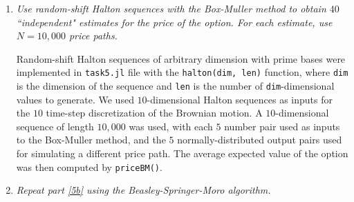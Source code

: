 \documentclass{article}
\DeclarePairedDelimiter \parens{(}{)}
\begin{document}
\begin{enumerate}
\begin{enumerate}
                If we model the stock price as a Geometric Brownian Motion, we obtain the following general formula for the stock price assuming no arbitrage
                $S_t = S_0e^{\displaystyle\parens*{r - \sfrac{\sigma^2}{2}}t - \sigma W(t)}$
                where $W(t) \sim N\parens*{0, \sqrt{t}}$ is a standard Brownian motion.
                To find the price $C$ of a European call option written on $S$ with strike $K = 50$ with maturity $T = 1$,
                we use the Black-Scholes formula, here adapted from Baxter \& Rennie's Financial Calculus,
                \begin{align*}
                    C &= S_0\Phi\parens*{\frac{\log\parens*{\sfrac{S_0}{K}} + \parens*{r + \sfrac{\sigma^2}{2}}T}{\sigma\sqrt{T}}}
                    - Ke^{-rT}\Phi\parens*{\frac{\log\parens*{\sfrac{S_0}{K}} + \parens*{r - \sfrac{\sigma^2}{2}}T}{\sigma\sqrt{T}}}\\
                    &= 50\Phi\parens*{\frac{\log\parens*{1} + \parens*{0.1 + \sfrac{0.09}{2}}}{0.3}}
                    - 50e^{-0.1}\Phi\parens*{\frac{\log\parens*{1} + \parens*{0.1 - \sfrac{0.09}{2}}}{0.3}}\\
                    &= 50\parens*{\Phi\parens*{\frac{0.145}{0.3}} - e^{-0.1}\Phi\parens*{\frac{0.055}{0.3}}}\\
                    &\approx 50\parens*{0.6855704621388224 - e^{-0.1}0.5727317593030405}\\
                    &\approx 8.367066791193329,
                \end{align*}
                and approximated using Julia, where $\Phi$ is the standard normal cumulative distribution function.
            \item \label{5b}
                {\it Use random-shift Halton sequences with the Box-Muller method to obtain $40$ ``independent" estimates for the price of the option.
                For each estimate, use $N = 10,000$ price paths.}

                Random-shift Halton sequences of arbitrary dimension with prime bases were implemented in \texttt{task5.jl} file with the
                \texttt{halton(dim, len)} function, where \texttt{dim} is the dimension of the sequence and \texttt{len} is the number of
                \texttt{dim}-dimensional values to generate.
                We used $10$-dimensional Halton sequences as inputs for the $10$ time-step discretization of the Brownian motion.
                A $10$-dimensional sequence of length $10,000$ was used, with each $5$ number pair used as inputs to the Box-Muller method,
                and the $5$ normally-distributed output pairs used for simulating a different price path.
                The average expected value of the option was then computed by \texttt{priceBM()}.
            \item \label{5c}
                {\it Repeat part \ref{5b} using the Beasley-Springer-Moro algorithm.}


\end{enumerate}
\end{enumerate}
\end{document}
